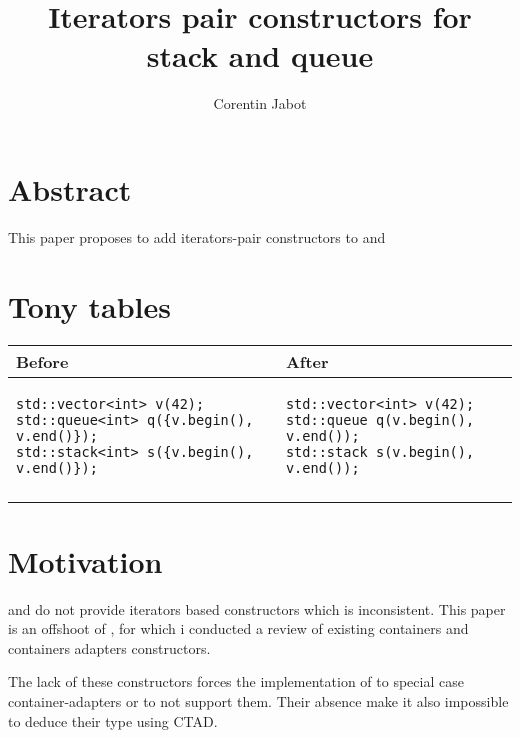\documentclass{wg21}
\title{Iterators pair constructors for stack and queue}
\author{Corentin Jabot}{corentin.jabot@gmail.com}
\begin{document}
\maketitle

\section{Abstract}

This paper proposes to add iterators-pair constructors to  and 

\section{Tony tables}
\begin{center}
\begin{tabular}{l|l}
Before & After\\ \hline

\begin{minipage}[t]{0.5\textwidth}
\begin{verbatim}
std::vector<int> v(42);
std::queue<int> q({v.begin(), v.end()});
std::stack<int> s({v.begin(), v.end()});
\end{verbatim}
\end{minipage}
&
\begin{minipage}[t]{0.3\textwidth}
\begin{verbatim}
std::vector<int> v(42);
std::queue q(v.begin(), v.end());
std::stack s(v.begin(), v.end());
\end{verbatim}
\end{minipage}
\\\\ \hline

\end{tabular}
\end{center}


\section{Motivation}

 and  do not provide iterators based constructors which is inconsistent.
This paper is an offshoot of \cite{P1206}, for which i conducted a review of existing containers and containers adapters constructors.

The lack of these constructors forces the implementation of  to special case container-adapters or to not support them.
Their absence make it also impossible to deduce their type using CTAD.
\end{document}
